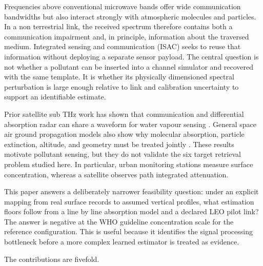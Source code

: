 \documentclass[conference]{IEEEtran}
\begin{document}
Frequencies above conventional microwave bands offer wide communication bandwidths but also interact strongly with atmospheric molecules and particles. In a non terrestrial link, the received spectrum therefore contains both a communication impairment and, in principle, information about the traversed medium. Integrated sensing and communication (ISAC) seeks to reuse that information without deploying a separate sensor payload. The central question is not whether a pollutant can be inserted into a channel simulator and recovered with the same template. It is whether its physically dimensioned spectral perturbation is large enough relative to link and calibration uncertainty to support an identifiable estimate.

Prior satellite sub THz work has shown that communication and differential absorption radar can share a waveform for water vapour sensing \cite{aliaga2024dar}. General space air ground propagation models also show why molecular absorption, particle extinction, altitude, and geometry must be treated jointly \cite{yang2024attenuation}. These results motivate pollutant sensing, but they do not validate the six target retrieval problem studied here. In particular, urban monitoring stations measure surface concentration, whereas a satellite observes path integrated attenuation.

This paper answers a deliberately narrower feasibility question: under an explicit mapping from real surface records to assumed vertical profiles, what estimation floors follow from a line by line absorption model and a declared LEO pilot link? The answer is negative at the WHO guideline concentration scale for the reference configuration. This is useful because it identifies the signal processing bottleneck before a more complex learned estimator is treated as evidence.

The contributions are fivefold.
\end{document}

